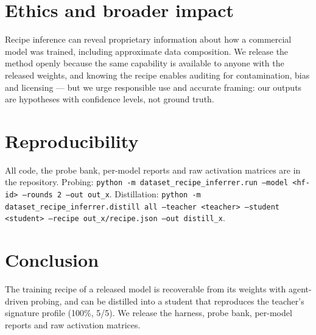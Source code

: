 \documentclass[11pt]{article}
\begin{document}
\section{Ethics and broader impact}
Recipe inference can reveal proprietary information about how a commercial model was
trained, including approximate data composition. We release the method openly because the
same capability is available to anyone with the released weights, and knowing the recipe
enables auditing for contamination, bias and licensing --- but we urge responsible use and
accurate framing: our outputs are hypotheses with confidence levels, not ground truth.

\section{Reproducibility}
All code, the probe bank, per-model reports and raw activation matrices are in the
repository. Probing: \texttt{python -m dataset\_recipe\_inferrer.run --model <hf-id>
--rounds 2 --out out\_x}. Distillation: \texttt{python -m
dataset\_recipe\_inferrer.distill all --teacher <teacher> --student <student> --recipe
out\_x/recipe.json --out distill\_x}.

\section{Conclusion}
The training recipe of a released model is recoverable from its weights with
agent-driven probing, and can be distilled into a student that reproduces the teacher's
signature profile (100\%, 5/5). We release the harness, probe bank, per-model reports
and raw activation matrices.



\end{document}
